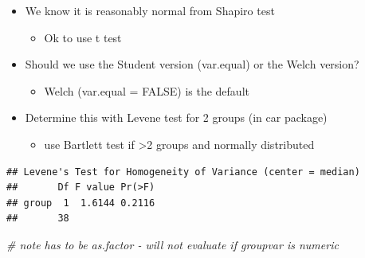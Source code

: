 \documentclass[
]{book}
\newenvironment{Shaded}{\begin{snugshade}}{\end{snugshade}}
\newcommand{\CommentTok}[1]{\textcolor[rgb]{0.56,0.35,0.01}{\textit{#1}}}
\newcommand{\DataTypeTok}[1]{\textcolor[rgb]{0.13,0.29,0.53}{#1}}
\newcommand{\FloatTok}[1]{\textcolor[rgb]{0.00,0.00,0.81}{#1}}
\newcommand{\KeywordTok}[1]{\textcolor[rgb]{0.13,0.29,0.53}{\textbf{#1}}}
\newcommand{\NormalTok}[1]{#1}
\newcommand{\OperatorTok}[1]{\textcolor[rgb]{0.81,0.36,0.00}{\textbf{#1}}}
\newcommand{\StringTok}[1]{\textcolor[rgb]{0.31,0.60,0.02}{#1}}
\providecommand{\tightlist}{%
  \setlength{\itemsep}{0pt}\setlength{\parskip}{0pt}}
\begin{document}
\begin{itemize}
\tightlist
\item
  We know it is reasonably normal from Shapiro test

  \begin{itemize}
  \tightlist
  \item
    Ok to use t test
  \end{itemize}
\item
  Should we use the Student version (var.equal) or the Welch version?

  \begin{itemize}
  \tightlist
  \item
    Welch (var.equal = FALSE) is the default
  \end{itemize}
\item
  Determine this with Levene test for 2 groups (in car package)

  \begin{itemize}
  \tightlist
  \item
    use Bartlett test if \textgreater2 groups and normally distributed
  \end{itemize}
\end{itemize}

\begin{Shaded}
\end{Shaded}

\begin{verbatim}
## Levene's Test for Homogeneity of Variance (center = median)
##       Df F value Pr(>F)
## group  1  1.6144 0.2116
##       38
\end{verbatim}

\begin{Shaded}
\begin{Highlighting}[]
\CommentTok{# note has to be as.factor - will not evaluate if groupvar is numeric}
\end{Highlighting}
\end{Shaded}
\end{document}
